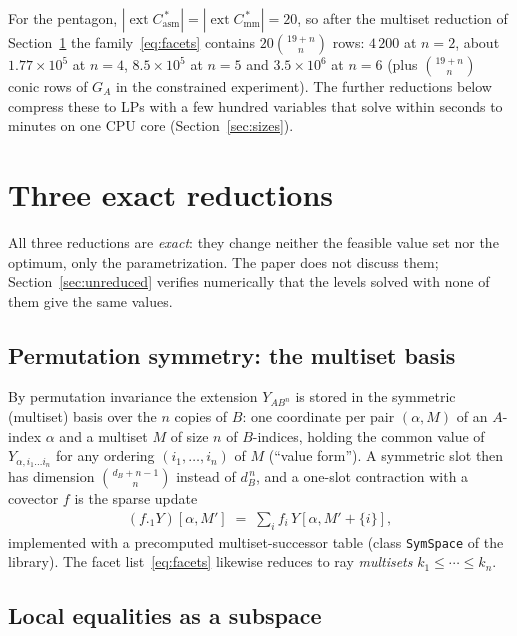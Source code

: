 \documentclass[11pt,a4paper]{article}
\newcommand*{\lrvert}[1]{\left\lvert #1 \right\rvert}
\DeclareMathOperator{\ext}{ext}
\newcommand*{\Casm}{C_{\mathrm{asm}}}
\newcommand*{\Cmm}{C_{\mathrm{mm}}}
\newcommand*{\code}[1]{\texttt{#1}}
\theoremstyle{remark}
\begin{document}
For the pentagon,
$\lrvert{\ext \Casm^{\,*}}=\lrvert{\ext \Cmm^{\,*}}=20$, so after the
multiset reduction of Section~\ref{sec:reductions} the family~\eqref{eq:facets}
contains $20\binom{19+n}{n}$ rows: $4\,200$ at $n=2$, about
$1.77\times 10^5$ at $n=4$, $8.5\times 10^5$ at $n=5$ and $3.5\times 10^6$
at $n=6$ (plus $\binom{19+n}{n}$ conic rows of $G_A$ in the constrained
experiment). The further reductions below compress these to LPs with a few
hundred variables that solve within seconds to minutes on one CPU core
(Section~\ref{sec:sizes}).

\section{Three exact reductions}\label{sec:reductions}

All three reductions are \emph{exact}: they change neither the feasible
value set nor the optimum, only the parametrization. The paper does not
discuss them; Section~\ref{sec:unreduced} verifies numerically that the
levels solved with none of them give the same values.

\subsection{Permutation symmetry: the multiset basis}

By permutation invariance the extension $Y_{AB^n}$ is stored in the
symmetric (multiset) basis over the $n$ copies of $B$: one coordinate per
pair $(\alpha, M)$ of an $A$-index $\alpha$ and a multiset $M$ of size $n$
of $B$-indices, holding the common value of $Y_{\alpha, i_1\ldots i_n}$
for any ordering $(i_1,\ldots,i_n)$ of $M$ (``value form''). A symmetric
slot then has dimension $\binom{d_B+n-1}{n}$ instead of $d_B^{\,n}$, and a
one-slot contraction with a covector $f$ is the sparse update
\begin{align*}
    (f\mathbin{._1}Y)[\alpha, M'] \;=\; \sum_i f_i\, Y[\alpha, M'+\lbrace i\rbrace],
\end{align*}
implemented with a precomputed multiset-successor table (class
\code{SymSpace} of the library). The facet list~\eqref{eq:facets}
likewise reduces to ray \emph{multisets} $k_1\leq\cdots\leq k_n$.

\subsection{Local equalities as a subspace}
\end{document}
